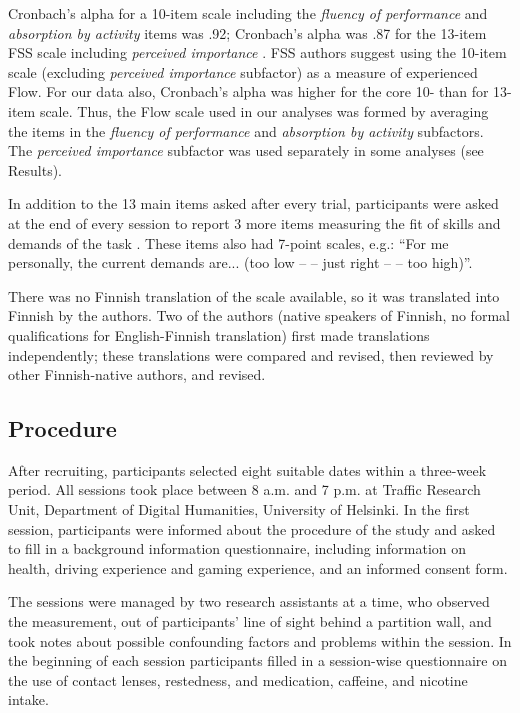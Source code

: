 \documentclass{frontierstyle/frontiersSCNS}
\begin{document}
Cronbach's alpha for a 10-item scale including the {\it fluency of performance} and {\it absorption by activity} items was .92; Cronbach's alpha was .87 for the 13-item FSS scale including {\it perceived importance} \citep{Rheinberg2003}. FSS authors \citep{Rheinberg2003} suggest using the 10-item scale (excluding {\it perceived importance} subfactor) as a measure of experienced Flow. For our data also, Cronbach's alpha was higher for the core 10- than for 13-item scale. Thus, the Flow scale used in our analyses was formed by averaging the items in the {\it fluency of performance} and {\it absorption by activity} subfactors. The {\it perceived importance} subfactor was used separately in some analyses (see Results).

In addition to the 13 main items asked after every trial, participants were asked at the end of every session to report 3 more items measuring the fit of skills and demands of the task  \citep{Rheinberg2003}. These items also had 7-point scales, e.g.: ``For me personally, the current demands are... (too low -- -- just right -- -- too high)''.

There was no Finnish translation of the scale available, so it was translated into Finnish by the authors. Two of the authors (native speakers of Finnish, no formal qualifications for English-Finnish translation) first made translations independently; these translations were compared and revised, then reviewed by other Finnish-native authors, and revised.

\subsection{Procedure}
After recruiting, participants selected eight suitable dates within a three-week period. All sessions took place between 8 a.m. and 7 p.m. at Traffic Research Unit, Department of Digital Humanities, University of Helsinki. In the first session, participants were informed about the procedure of the study and asked to fill in a background information questionnaire, including information on health, driving experience and gaming experience, and an informed consent form.

The sessions were managed by two research assistants at a time, who observed the measurement, out of participants' line of sight behind a partition wall, and took notes about possible confounding factors and problems within the session. In the beginning of each session participants filled in a session-wise questionnaire on the use of contact lenses, restedness, and medication, caffeine, and nicotine intake.
\end{document}
